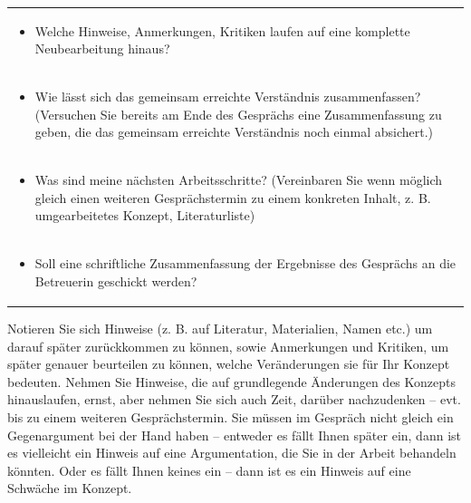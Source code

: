 \documentclass[]{book}
\providecommand{\tightlist}{%
  \setlength{\itemsep}{0pt}\setlength{\parskip}{0pt}}
\theoremstyle{definition}
\theoremstyle{definition}
\theoremstyle{definition}
\theoremstyle{remark}
\begin{document}
\begin{longtable}[]{@{}l@{}}
\begin{minipage}[t]{0.97\columnwidth}\raggedright\strut
\begin{itemize}
\tightlist
\item
  Welche Hinweise, Anmerkungen, Kritiken laufen auf eine komplette
  Neubearbeitung hinaus?
\end{itemize}\strut
\end{minipage}\tabularnewline
\begin{minipage}[t]{0.97\columnwidth}\raggedright\strut
\begin{itemize}
\tightlist
\item
  Wie lässt sich das gemeinsam erreichte Verständnis zusammenfassen?
  (Versuchen Sie bereits am Ende des Gesprächs eine Zusammenfassung zu
  geben, die das gemeinsam erreichte Verständnis noch einmal absichert.)
\end{itemize}\strut
\end{minipage}\tabularnewline
\begin{minipage}[t]{0.97\columnwidth}\raggedright\strut
\begin{itemize}
\tightlist
\item
  Was sind meine nächsten Arbeitsschritte? (Vereinbaren Sie wenn möglich
  gleich einen weiteren Gesprächstermin zu einem konkreten Inhalt, z. B.
  umgearbeitetes Konzept, Literaturliste)
\end{itemize}\strut
\end{minipage}\tabularnewline
\begin{minipage}[t]{0.97\columnwidth}\raggedright\strut
\begin{itemize}
\tightlist
\item
  Soll eine schriftliche Zusammenfassung der Ergebnisse des Gesprächs an
  die Betreuerin geschickt werden?
\end{itemize}\strut
\end{minipage}\tabularnewline
\bottomrule
\end{longtable}

Notieren Sie sich Hinweise (z. B. auf Literatur, Materialien, Namen
etc.) um darauf später zurückkommen zu können, sowie Anmerkungen und
Kritiken, um später genauer beurteilen zu können, welche Veränderungen
sie für Ihr Konzept bedeuten. Nehmen Sie Hinweise, die auf grundlegende
Änderungen des Konzepts hinauslaufen, ernst, aber nehmen Sie sich auch
Zeit, darüber nachzudenken -- evt. bis zu einem weiteren
Gesprächstermin. Sie müssen im Gespräch nicht gleich ein Gegenargument
bei der Hand haben -- entweder es fällt Ihnen später ein, dann ist es
vielleicht ein Hinweis auf eine Argumentation, die Sie in der Arbeit
behandeln könnten. Oder es fällt Ihnen keines ein -- dann ist es ein
Hinweis auf eine Schwäche im Konzept.
\end{document}
